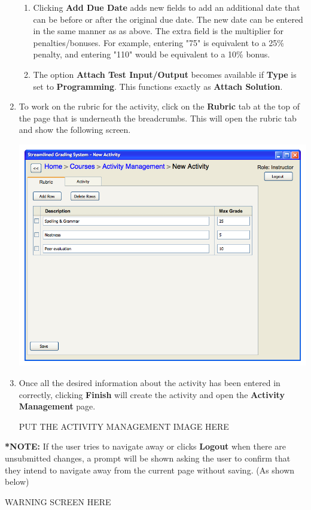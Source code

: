 \documentclass{article}
\begin{document}
\begin{enumerate}
\begin{center}
  \end{center}
  \begin{enumerate}
  \item Clicking \textbf{Add Due Date} adds new fields to add an additional
    date that can be before or after the original due date. The new date can
    be entered in the same manner as as above. The extra field is the multiplier
    for penalties/bonuses. For example, entering "75" is equivalent to a 25\%
    penalty, and entering "110" would be equivalent to a 10\% bonus.
  \item The option \textbf{Attach Test Input/Output} becomes available if \textbf{Type} 
  is set to \textbf{Programming}. This functions exactly as \textbf{Attach Solution}.
 \end{enumerate}
 \item To work on the rubric for the activity, click on the \textbf{Rubric} tab at the 
 top of the page that is underneath the breadcrumbs. This will open the rubric tab and 
 show the following screen.
 \begin{center} 
 

\includegraphics[scale=0.55]{../images/UIMockups/pngs/newActivityRubric}
 \end{center}
 \item Once all the desired information about the activity has been entered
   in correctly, clicking \textbf{Finish} will create the activity and open
   the \textbf{Activity Management} page.
  \begin{center} 
    PUT THE ACTIVITY MANAGEMENT IMAGE HERE
  \end{center}
\end{enumerate}
\textbf{*NOTE:} If the user tries to navigate away or clicks \textbf{Logout} when 
there are unsubmitted changes, a prompt will be shown asking the user to confirm that 
they intend to navigate away from the current page without saving. (As shown below)
\begin{center} 
  WARNING SCREEN HERE
\end{center}
\end{document}
